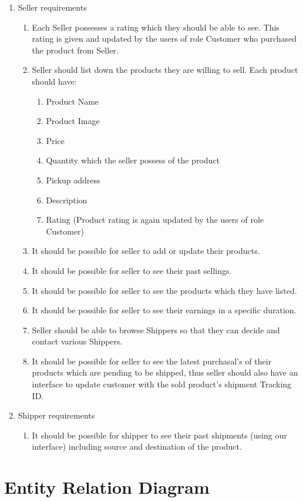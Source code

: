 \documentclass[a4paper,12pt]{article}
\begin{document}
\begin{enumerate}
  \item Seller requirements
  \begin{enumerate}
    \item Each Seller possesses a rating which they should be able to see. This rating is given and updated by the users of role Customer who purchased the product from Seller.
    \item Seller should list down the products they are willing to sell. Each product should have:
    \begin{enumerate}
      \item Product Name
      \item Product Image
      \item Price 
      \item Quantity which the seller possess of the product
      \item Pickup address
      \item Description
      \item Rating (Product rating is again updated by the users of role Customer)
    \end{enumerate}
    \item It should be possible for seller to add or update their products.
    \item It should be possible for seller to see their past sellings.
    \item It should be possible for seller to see the products which they have listed. 
    \item It should be possible for seller to see their earnings in a specific duration. 
    \item Seller should be able to browse Shippers so that they can decide and contact various Shippers.
    \item It should be possible for seller to see the latest purchasal's of their products which are pending to be shipped, thus seller should also have an interface to update customer with the sold product's shipment Tracking ID.
  \end{enumerate}
  \item Shipper requirements
    \begin{enumerate}
      \item It should be possible for shipper to see their past shipments (using our interface) including source and destination of the product.
    \end{enumerate}
\end{enumerate}

\section{Entity Relation Diagram}
\end{document}

